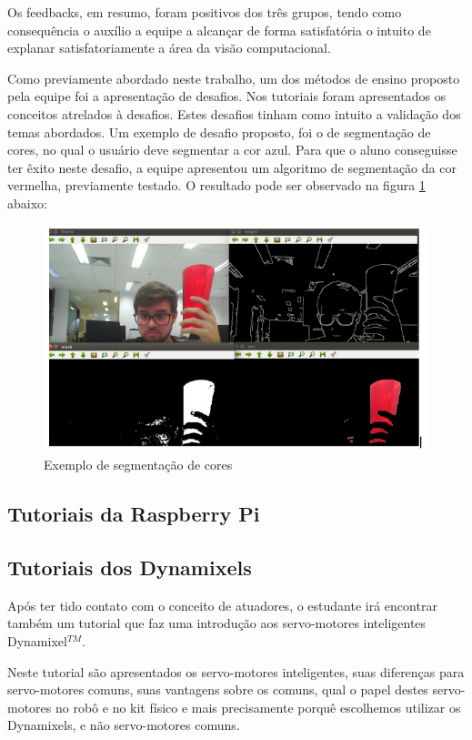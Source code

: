 Os feedbacks, em resumo, foram positivos dos três grupos, tendo como consequência o auxílio a equipe a alcançar de forma satisfatória o intuito de explanar satisfatoriamente a área da visão computacional.

Como previamente abordado neste trabalho, um dos métodos de ensino proposto pela equipe foi a apresentação de desafios. Nos tutoriais foram apresentados os conceitos atrelados à desafios. Estes desafios tinham como intuito a validação dos temas abordados. Um exemplo de desafio proposto, foi o de segmentação de cores, no qual o usuário deve segmentar a cor azul. Para que o aluno conseguisse ter êxito neste desafio, a equipe apresentou  um algoritmo de segmentação da cor vermelha, previamente testado. O resultado pode ser observado na figura \ref{fig:vermelho} abaixo:

\begin{figure}[H]
	\centering
	\includegraphics[scale=0.75, angle=0]{Figures/vermelho.png}
	\caption{Exemplo de segmentação de cores}
	\label{fig:vermelho}
\end{figure}
\subsection{Tutoriais da Raspberry Pi}

\subsection{Tutoriais dos Dynamixels}
Após ter tido contato com o conceito de atuadores, o estudante irá encontrar também um tutorial que faz uma introdução aos servo-motores inteligentes Dynamixel$^{TM}$.

Neste tutorial são apresentados os servo-motores inteligentes, suas diferenças para servo-motores comuns, suas vantagens sobre os comuns, qual o papel destes servo-motores no robô e no kit físico e mais precisamente porquê escolhemos utilizar os Dynamixels, e não servo-motores comuns. \cite{tutDyna}


